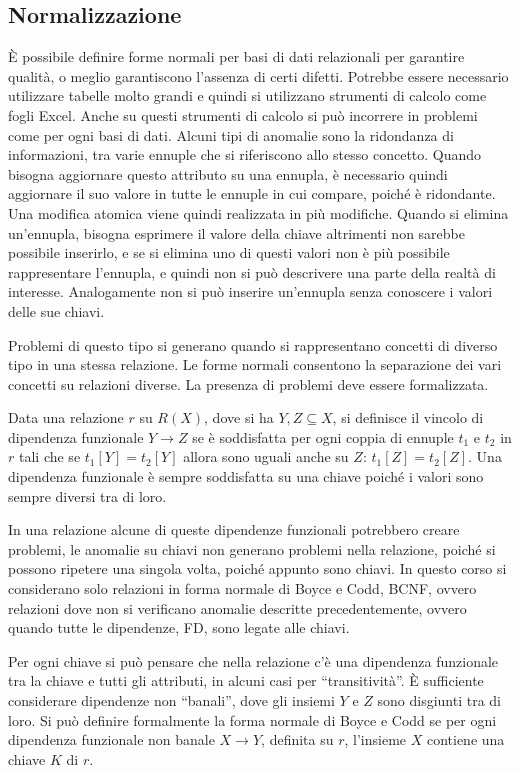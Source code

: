 \documentclass{article}
\numberwithin{equation}{subsection}
\begin{document}
\subsection{Normalizzazione}

\`{E} possibile definire forme normali per basi di dati relazionali per garantire qualità, o meglio garantiscono l'assenza di certi difetti. 
Potrebbe essere necessario utilizzare tabelle molto grandi e quindi si utilizzano strumenti di calcolo come fogli Excel. Anche su questi strumenti di calcolo si può 
incorrere in problemi come per ogni basi di dati. 
Alcuni tipi di anomalie sono la ridondanza di informazioni, tra varie ennuple che si riferiscono allo stesso concetto. 
Quando bisogna aggiornare questo attributo su una ennupla, è necessario quindi aggiornare il suo valore in tutte le ennuple in cui compare, poiché è ridondante. Una modifica 
atomica viene quindi realizzata in più modifiche. Quando si elimina un'ennupla, bisogna esprimere il valore della chiave altrimenti non sarebbe possibile inserirlo, e 
se si elimina uno di questi valori non è più possibile rappresentare l'ennupla, e quindi non si può descrivere una parte della realtà di interesse. Analogamente non si 
può inserire un'ennupla senza conoscere i valori delle sue chiavi. 

Problemi di questo tipo si generano quando si rappresentano concetti di diverso tipo in una stessa relazione. Le forme normali consentono la separazione dei vari 
concetti su relazioni diverse. La presenza di problemi deve essere formalizzata. 

Data una relazione $r$ su $R(X)$, dove si ha $Y,Z\subseteq X$, si definisce il vincolo di dipendenza funzionale $Y\to Z$ se è soddisfatta per ogni 
coppia di ennuple $t_1$ e $t_2$ in $r$ tali che se $t_1[Y]=t_2[Y]$ allora sono uguali anche su $Z$: $t_1[Z]=t_2[Z]$. 
Una dipendenza funzionale è sempre soddisfatta su una chiave poiché i valori sono sempre diversi tra di loro. 

In una relazione alcune di queste dipendenze funzionali potrebbero creare problemi, le anomalie su chiavi non generano problemi nella relazione, poiché si possono 
ripetere una singola volta, poiché appunto sono chiavi. 
In questo corso si considerano solo relazioni in forma normale di Boyce e Codd, BCNF, ovvero relazioni dove non si verificano anomalie descritte precedentemente, 
ovvero quando tutte le dipendenze, FD, sono legate alle chiavi. 

Per ogni chiave si può pensare che nella relazione c'è una dipendenza funzionale tra la chiave e tutti gli attributi, in alcuni casi per ``transitività''. 
\`{E} sufficiente considerare dipendenze non ``banali'', dove gli insiemi $Y$ e $Z$ sono disgiunti tra di loro. 
Si può definire formalmente la forma normale di Boyce e Codd se per ogni dipendenza funzionale non banale $X\to Y$, definita su $r$, l'insieme $X$ contiene 
una chiave $K$ di $r$. 
\end{document}
